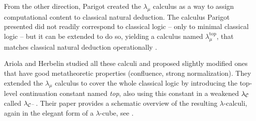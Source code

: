 From the other direction, Parigot created the $\lambda_\mu$ calculus \cite{parigot92}
as a way to assign computational content to classical natural deduction. The calculus
Parigot presented did not readily correspond to classical logic --
only to minimal classical logic -- but it can be extended to do so, yielding
a calculus named $\lambda_\mu^\mathrm{top}$, that matches classical natural deduction
operationally \cite{ariola-herbelin}.

\begin{comment}
\subsubsection{Parigot's $\lambda_\mu$ calculus}

The $\lambda_\mu$ calculus does not have control operators; instead, it extends
the $\lambda$-syntax by distinguishing between \emph{terms} and \emph{commands}
and introducing variables for continuations. A brief overview of the syntax
can be found in \Fref{fig:lambda-mu}; for proper definitions and a more thorough
discussion, the interested reader is referred to \cite{parigot92} or \cite{ariola-herbelin}.

The most interesting property for us is perhaps 

\begin{figure}
\centering
\begin{minipage}{0.75\textwidth}
Types:
\[ \rho, \sigma ::= \alpha \sbar \sigma \to \rho \]
Terms:
\[ r, s, t ::= x \sbar \lambda x : \rho.\, r \sbar s t \sbar \mu \alpha : \rho.\, c \]
Commands:
\[ c, d ::= [\alpha] t \]
Example terms:\\
\ughcenter{$\lam{x:\sigma} x$,\;\; $\lmu{\alpha:\rho} [\beta] \lam{y:\sigma} y$}
\end{minipage}
\caption{Syntax of $\lambda_\mu$}
\label{fig:lambda-mu}
\end{figure}
\end{comment}

Ariola and Herbelin studied all these calculi and proposed
slightly modified ones that have good metatheoretic properties (confluence, strong
normalization). They extended the $\lambda_\mu$ calculus to cover the whole classical
logic by introducing the top-level continuation constant named \emph{top}, also using this constant
in a weakened $\lambda_{\mathcal{C}}$ called $\lambda_{\mathcal{C}^-}$.
Their paper provides a schematic overview of the resulting $\lambda$-calculi, again in the
elegant form of a $\lambda$-cube, see .


